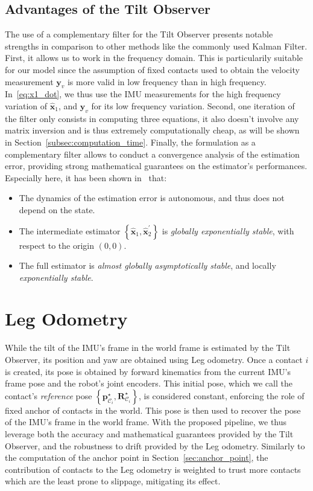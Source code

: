 \documentclass{IJCAS}
\begin{document}
\subsection{Advantages of the Tilt Observer}
The use of a complementary filter for the Tilt Observer presents notable strengths in comparison to other methods like the commonly used Kalman Filter. First, it allows us to work in the frequency domain. This is particularily suitable for our model since the assumption of fixed contacts used to obtain the velocity measurement $\boldsymbol{y}_v$ is more valid in low frequency than in high frequency. In~\eqref{eq:x1_dot}, we thus use the IMU measurements for the high frequency variation of $\hat{\boldsymbol{x}}_{1}$, and $\boldsymbol{y}_v$ for its low frequency variation. Second, one iteration of the filter only consists in computing three equations, it also doesn't involve any matrix inversion and is thus extremely computationally cheap, as will be shown in Section~\ref{subsec:computation_time}. Finally, the formulation as a complementary filter allows to conduct a convergence analysis of the estimation error, providing strong mathematical guarantees on the estimator's performances. Especially here, it has been shown in~\cite{benallegue2020LyapunovStableOrientationEstimatorHumanoids} that:
\begin{itemize}
    \item The dynamics of the estimation error is autonomous, and thus does not depend on the state. 
    \item The intermediate estimator $\left\{\hat{\boldsymbol{x}}_{1}, \hat{\boldsymbol{x}}_{2}^{\prime} \right\}$ is \emph{globally exponentially stable}, with respect to the origin $\left(0,0\right)$.
    \item The full estimator is \emph{almost globally asymptotically stable}, and locally \emph{exponentially stable}.
\end{itemize}

\section{Leg Odometry}

While the tilt of the IMU's frame in the world frame is estimated by the Tilt Observer, its position and yaw are obtained using Leg odometry. Once a contact $i$ is created, its pose is obtained by forward kinematics from the current IMU's frame pose and the robot's joint encoders. This initial pose, which we call the contact's \emph{reference} pose $\left\{ \boldsymbol{p}^{\star}_{\mathcal{C}_{i}}, \boldsymbol{R}^{\star}_{\mathcal{C}_{i}}\right\}$, is considered constant, enforcing the role of fixed anchor of contacts in the world. This pose is then used to recover the pose of the IMU's frame in the world frame. 
With the proposed pipeline, we thus leverage both the accuracy and mathematical guarantees provided by the Tilt Observer, and the robustness to drift provided by the Leg odometry. Similarly to the computation of the anchor point in Section~\ref{sec:anchor_point}, the contribution of contacts to the Leg odometry is weighted to trust more contacts which are the least prone to slippage, mitigating its effect.
\end{document}
